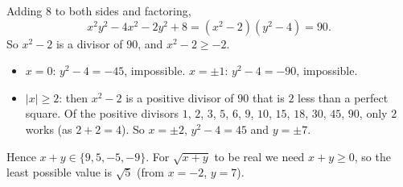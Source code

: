 Adding $8$ to both sides and factoring,
\[x^2y^2-4x^2-2y^2+8=\left(x^2-2\right)\left(y^2-4\right)=90 .\]
So $x^2-2$ is a divisor of $90$, and $x^2-2\ge-2$.
\begin{itemize}
\item $x=0$: $y^2-4=-45$, impossible. $x=\pm1$: $y^2-4=-90$, impossible.
\item $|x|\ge2$: then $x^2-2$ is a positive divisor of $90$ that is $2$ less than a perfect square. Of the positive divisors $1$, $2$, $3$, $5$, $6$, $9$, $10$, $15$, $18$, $30$, $45$, $90$, only $2$ works (as $2+2=4$). So $x=\pm2$, $y^2-4=45$ and $y=\pm7$.
\end{itemize}
Hence $x+y\in\{9,5,-5,-9\}$. For $\sqrt{x+y}$ to be real we need $x+y\ge0$, so the least possible value is $\boxed{\sqrt5}$ (from $x=-2$, $y=7$).
